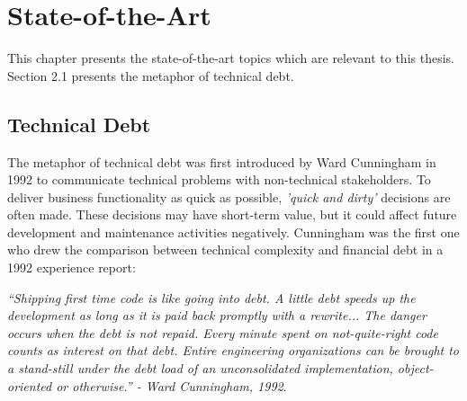 






\chapter{State-of-the-Art}
This chapter presents the state-of-the-art topics which are relevant to this thesis. Section 2.1 presents the metaphor of technical debt. 












\section{Technical Debt}
The metaphor of technical debt was first introduced by Ward Cunningham in 1992 to communicate technical problems with non-technical stakeholders\cite{p29-cunningham}. To deliver business functionality as quick as possible, \textit{'quick and dirty'} decisions are often made. These decisions may have short-term value, but it could affect future development and maintenance activities negatively. Cunningham was the first one who drew the comparison between technical complexity and financial debt in a 1992 experience report\cite{p29-cunningham}: 

\begin{displayquote}
	\textit{“Shipping first time code is like going into debt. A little debt speeds up the development as long as it is paid back promptly with a rewrite... The danger occurs when the debt is not repaid. Every minute spent on not-quite-right code counts as interest on that debt. Entire engineering organizations can be brought to a stand-still under the debt load of an unconsolidated implementation, object-oriented or otherwise.” - Ward Cunningham, 1992}.
\end{displayquote}

